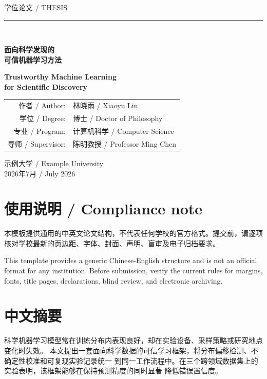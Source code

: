 \documentclass[UTF8,11pt,oneside,fontset=fandol]{ctexbook}
\begin{document}
\begin{titlepage}
\centering
\vspace*{0.5cm}
{\Large 学位论文 / THESIS}\\[1.2cm]
{\color{accent}\rule{0.86\textwidth}{1.5pt}}\\[1cm]
{\Huge\bfseries 面向科学发现的\\
可信机器学习方法\par}
\vspace{0.6cm}
{\LARGE\bfseries Trustworthy Machine Learning\\
for Scientific Discovery\par}
\vspace{1.3cm}

\begin{tabular}{rl}
作者 / Author: & 林晓雨 / Xiaoyu Lin \\
学位 / Degree: & 博士 / Doctor of Philosophy \\
专业 / Program: & 计算机科学 / Computer Science \\
导师 / Supervisor: & 陈明教授 / Professor Ming Chen \\
\end{tabular}

\vfill
{\Large 示例大学 / Example University}\\[0.3cm]
2026年7月 / July 2026
\end{titlepage}

\frontmatter
\chapter*{使用说明 / Compliance note}
本模板提供通用的中英文论文结构，不代表任何学校的官方格式。提交前，请逐项核对学校最新的页边距、字体、封面、声明、盲审及电子归档要求。

This template provides a generic Chinese-English structure and is not an
official format for any institution. Before submission, verify the current
rules for margins, fonts, title pages, declarations, blind review, and
electronic archiving.

\chapter*{中文摘要}
科学机器学习模型常在训练分布内表现良好，却在实验设备、采样策略或研究地点变化时失效。
本文提出一套面向科学数据的可信学习框架，将分布偏移检测、不确定性校准和可复现实验记录统一
到同一工作流程中。在三个跨领域数据集上的实验表明，该框架能够在保持预测精度的同时显著
降低错误置信度。
\end{document}
